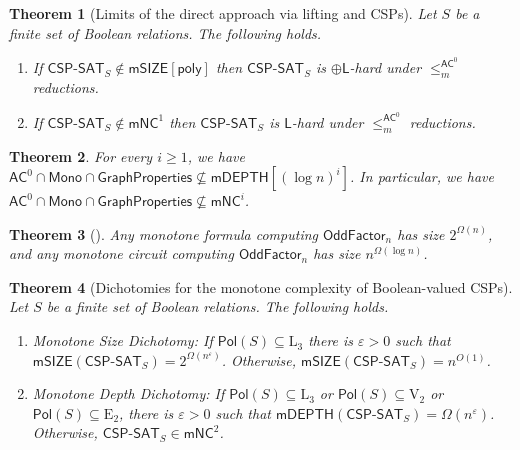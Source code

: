 \documentclass[10pt,a4paper]{article}
\newtheorem{theorem}{Theorem}[section]
\newcommand{\eps}{\varepsilon}
\newcommand{\complexityfont}[1]{\mathsf{#1}}
\newcommand{\monclass}[1]{\mathsf{m}#1}
\def\mNC          {\monclass{\NC}}
\def\AC           {\complexityfont{AC}}
\def\pL           {\oplus\complexityfont{L}}
\def\NC           {\complexityfont{NC}}
\def\SIZE         {\complexityfont{SIZE}}
\def\DEPTH        {\complexityfont{DEPTH}}
\def\mSIZE        {\monclass{\SIZE}}
\def\mDEPTH       {\monclass{\DEPTH}}
\renewcommand{\L} {\complexityfont{L}}
\newcommand{\semMon}[1]{#1 \cap \monfns}
\newcommand{\monfns}{\mathsf{Mono}}
\newcommand{\GraphPpts}{\mathsf{GraphProperties}}
\newcommand{\Cmon}[1]{\mathsf{mSIZE}({#1})}
\newcommand{\mdepth}[1]{\mathsf{mDEPTH}({#1})}
\def\sseq{\subseteq}
\newcommand{\OddFactor}{\mathsf{OddFactor}}
\newcommand{\CSPf}[1]{\mathsf{CSP}\text{-}\mathsf{SAT}_{#1}}
\newcommand{\Pol}{\mathsf{Pol}}
\newcommand{\acmred}{\leq^{\AC^0}_m\!}
\newcommand{\clonefont}[1]{\mathrm{#1}}
\begin{document}
\begin{theorem}[Limits of the direct approach via lifting and CSPs]
    \label{thm:cspsat-intro}
    Let $S$ be a finite set of Boolean relations. The following holds. 
    \begin{enumerate}
        \item    If 
            $\CSPf{S} \notin \mSIZE[\mathsf{poly}]$
            then
            $\CSPf{S}$ is 
             $\pL$-hard under
            $\acmred$ reductions.
        \item  
            If
            $\CSPf{S} \notin \mNC^1$
            then $\CSPf{S}$ is $\L$-hard under
            $\acmred$ reductions.
    \end{enumerate}
\end{theorem}

\begin{theorem}
    \label{thm:ac0-fml-graph}
    For every $i \geq 1$,
    we have
    $\semMon{\AC^0} \cap \GraphPpts \not\sseq \mDEPTH[(\log n)^i]$.
    In particular, we have
    $\semMon{\AC^0} \cap \GraphPpts \not\sseq \mNC^i$.
\end{theorem}

\begin{theorem}[\cite{DBLP:journals/combinatorica/BabaiGW99}]
    \label{thm:bip-oddfactor-lb}
        Any monotone formula computing 
        $\OddFactor_n$ 
        has size $2^{\Omega(n)}$,
        and any monotone circuit computing
        $\OddFactor_n$ 
        has size $n^{\Omega(\log n)}$.
\end{theorem}

\begin{theorem}[Dichotomies for the monotone complexity of Boolean-valued CSPs]
    \label{thm:intro-mon-dichotomies}
    Let $S$ be a finite set of Boolean relations. The following holds.
    \begin{enumerate}
        \item \emph{Monotone Size Dichotomy:} If 
    $\Pol(S) \sseq \clonefont{L_3}$
     there is $\eps > 0$
    such that
    $\Cmon{\CSPf{S}} = 2^{\Omega(n^\eps)}$.
    Otherwise, 
    $\Cmon{\CSPf{S}} = n^{O(1)}$.

\item \emph{Monotone Depth Dichotomy:}
    If 
    $\Pol(S) \sseq \clonefont{L_3}$ or
    $\Pol(S) \sseq \clonefont{V_2}$ or
    $\Pol(S) \sseq \clonefont{E_2}$,
     there is $\eps > 0$
    such that
    $\mdepth{\CSPf{S}} = {\Omega(n^\eps)}$.
    Otherwise, 
    $\CSPf{S} \in \mNC^2$.
    \end{enumerate}
    
\end{theorem}
\end{document}
